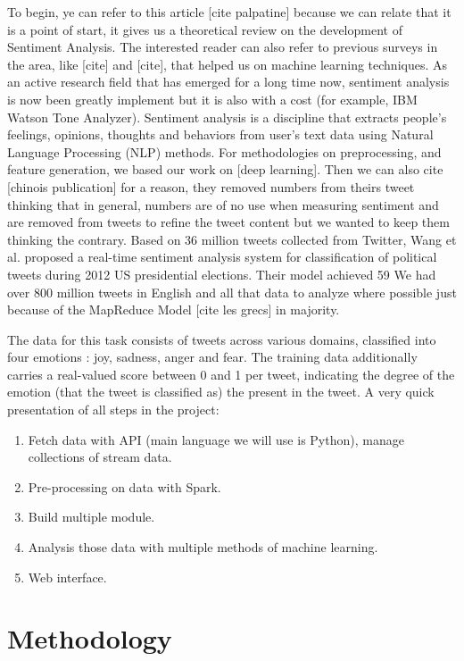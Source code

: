 \documentclass{acmtog} %
\begin{document}
To begin, ye can refer to this article [cite palpatine] because we can relate that it is a point of start, it gives us a theoretical review on the development of Sentiment Analysis.
The interested reader can also refer to previous surveys in the area, like [cite] and [cite], that helped us on machine learning techniques. As an active research field that has emerged for a long time now, sentiment analysis is now been greatly implement but it is also with a cost (for example, IBM Watson Tone Analyzer). Sentiment analysis is a discipline that extracts people’s feelings, opinions, thoughts and behaviors from user’s text data using Natural Language Processing (NLP) methods. 
For methodologies on preprocessing, and feature generation, we based our work on [deep learning]. Then we can also cite [chinois publication] for a reason, they removed numbers from theirs tweet thinking that in general, numbers are of no use when measuring sentiment and are removed from tweets to refine the tweet content but we wanted to keep them thinking the contrary.
Based on 36 million tweets collected from Twitter, Wang et al. proposed a real-time sentiment analysis system for classification of political tweets during 2012 US presidential elections. Their model achieved 59%
We had over 800 million tweets in English and all that data to analyze where possible just because of the MapReduce Model [cite les grecs] in majority.


The data for this task consists of tweets across various domains, classified into four emotions : joy, sadness, anger and fear. The training data additionally carries a real-valued score between 0 and 1 per tweet, indicating the degree of the emotion (that the tweet is classified as) the present in the tweet.
A very quick presentation of all steps in the project:
\begin{enumerate}
\item Fetch data with API (main language we will use is Python), manage collections of stream data.
\item Pre-processing on data with Spark.
\item Build multiple module.
\item Analysis those data with multiple methods of machine learning.
\item Web interface.
\end{enumerate}

\section{Methodology}
\label{sec:methodology}
\end{document}
